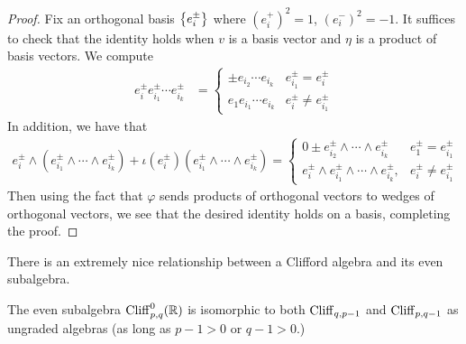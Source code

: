 \begin{proof}
Fix an orthogonal basis $\left\lbrace e_i^\pm \right\rbrace$ where $(e_i^+)^2 = 1$,
$(e_i^-)^2 = -1$. It suffices to check that the identity holds when $v$ is a
basis vector and $\eta$ is a product of basis vectors. We compute
\begin{align*}
e_i^\pm e_{i_1}^\pm\cdots e_{i_k}^\pm &= \begin{cases}
\pm e_{i_2}\cdots e_{i_k} & e_{i_1}^\pm = e_i^\pm \\
e_1e_{i_1}\cdots e_{i_k} & e_i^\pm \neq e_{i_1}^\pm
\end{cases}
\end{align*}
In addition, we have that
\begin{align*}
e_i^\pm \wedge (e_{i_1}^\pm\wedge\cdots\wedge e_{i_k}^\pm)
+ \iota(e_i^\pm)(e_{i_1}^\pm\wedge\cdots\wedge e_{i_k}^\pm) = \begin{cases}
0 \pm e_{i_2}^\pm \wedge \cdots \wedge e_{i_k}^\pm & e_1^\pm = e_{i_1}^\pm \\
e_i^\pm \wedge e_{i_1}^\pm \wedge\cdots\wedge e_{i_k}^\pm, & e_i^\pm \neq e_{i_1}^\pm
\end{cases}
\end{align*}
Then using the fact that $\varphi$ sends products of orthogonal vectors to
wedges of orthogonal vectors, we see that the desired identity holds on a basis,
completing the proof.
\end{proof}
%
There is an extremely nice relationship between a Clifford algebra
and its even subalgebra.
%
\begin{thm}
The even subalgebra $\operatorname{Cliff}_{p,q}^0(\mathbb{R})$ is isomorphic to both $\operatorname{Cliff}_{q, p-1}$
and $\operatorname{Cliff}_{p,q-1}$ as ungraded algebras (as long as $p-1 > 0$ or $q-1 > 0$.)
\end{thm}
%

